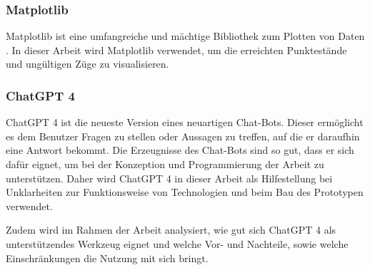 \subsubsection{Matplotlib}
Matplotlib ist eine umfangreiche und mächtige Bibliothek zum Plotten von Daten \cite{Hunter:2007}. In dieser Arbeit wird Matplotlib verwendet, um die erreichten Punktestände und ungültigen Züge zu visualisieren.
\subsubsection{ChatGPT 4}
ChatGPT 4 ist die neueste Version eines neuartigen Chat-Bots. Dieser ermöglicht es dem Benutzer Fragen zu stellen oder Aussagen zu treffen, auf die er daraufhin eine Antwort bekommt. Die Erzeugnisse des Chat-Bots sind so gut, dass er sich dafür eignet, um bei der Konzeption und Programmierung der Arbeit zu unterstützen. Daher wird ChatGPT 4 in dieser Arbeit als Hilfestellung bei Unklarheiten zur Funktionsweise von Technologien und beim Bau des Prototypen verwendet. 

Zudem wird im Rahmen der Arbeit analysiert, wie gut sich ChatGPT 4 als unterstützendes Werkzeug eignet und welche Vor- und Nachteile, sowie welche Einschränkungen die Nutzung mit sich bringt.